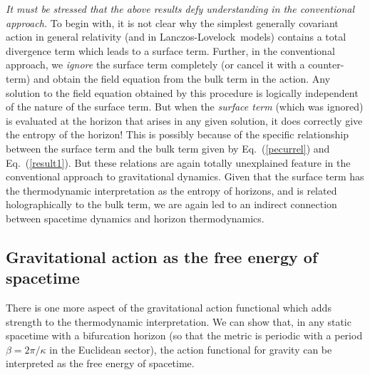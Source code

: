 \documentclass[12pt]{iopart}
\def\eq#1{{Eq.~(\ref{#1})}}
\newcommand{\LL}{Lanczos-Lovelock}
\begin{document}
\textit{It must be stressed that the above results defy understanding in the conventional approach.} To begin with, it is not clear why the simplest generally covariant action in general relativity (and in \LL\ models)  contains a total divergence term which leads to a surface term.
  Further, in the conventional  approach, we \textit{ignore} the surface term completely
(or cancel it with a counter-term) and obtain the field equation
from the bulk term in the action. Any solution to the field equation obtained 
by this procedure is logically independent of the nature of the surface term.
But  when the \textit{surface term} (which was ignored) is evaluated at the horizon that arises
in any given solution, it does correctly give the entropy of the horizon!
This is possibly because of the specific relationship 
between the 
surface term and the bulk term
 given by \eq{pecurrel} and \eq{result1}. But these relations are
 again totally unexplained feature in the conventional
approach to gravitational dynamics.
Given that the surface term has the thermodynamic interpretation as the entropy of horizons,
 and is related holographically to the bulk term, we are again led to 
an indirect connection between spacetime dynamics and horizon thermodynamics.


\subsection{Gravitational action as the free energy of spacetime}\label{sec:gravactfree}

There is one more aspect of the gravitational action functional which adds strength to the thermodynamic interpretation. We can show that, in any static spacetime with a bifurcation horizon (so that the metric is periodic with a period $\beta = 2\pi/\kappa$ in the Euclidean sector), the action functional for gravity can be interpreted as the free energy
of spacetime. 
\end{document}
